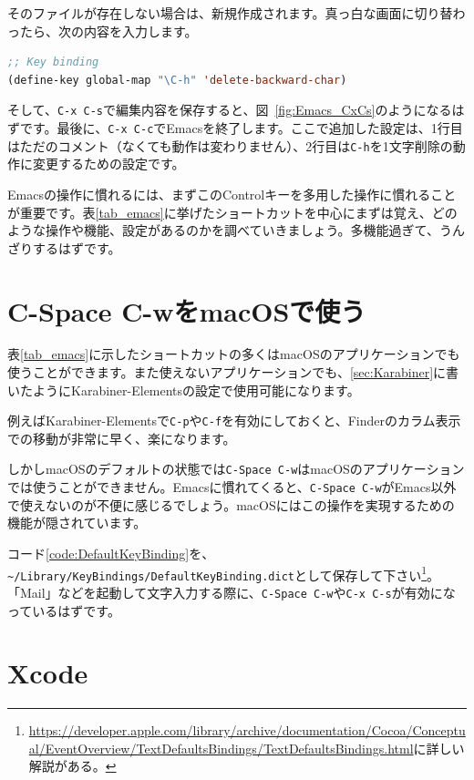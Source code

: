 そのファイルが存在しない場合は、新規作成されます。真っ白な画面に切り替わったら、次の内容を入力します。
\begin{lstlisting}[language=lisp]
;; Key binding
(define-key global-map "\C-h" 'delete-backward-char)
\end{lstlisting}
そして、\texttt{C-x C-s}で編集内容を保存すると、図~\ref{fig:Emacs_CxCs}のようになるはずです。最後に、\texttt{C-x C-c}でEmacsを終了します。ここで追加した設定は、1行目はただのコメント（なくても動作は変わりません）、2行目は\texttt{C-h}を1文字削除の動作に変更するための設定です。

Emacsの操作に慣れるには、まずこのControlキーを多用した操作に慣れることが重要です。表\ref{tab_emacs}に挙げたショートカットを中心にまずは覚え、どのような操作や機能、設定があるのかを調べていきましょう。多機能過ぎて、うんざりするはずです。

\section{C-Space C-wをmacOSで使う}

表\ref{tab_emacs}に示したショートカットの多くはmacOSのアプリケーションでも使うことができます。また使えないアプリケーションでも、\ref{sec:Karabiner}に書いたようにKarabiner-Elementsの設定で使用可能になります。

例えばKarabiner-Elementsで\texttt{C-p}や\texttt{C-f}を有効にしておくと、Finderのカラム表示での移動が非常に早く、楽になります。

しかしmacOSのデフォルトの状態では\texttt{C-Space C-w}はmacOSのアプリケーションでは使うことができません。Emacsに慣れてくると、\texttt{C-Space C-w}がEmacs以外で使えないのが不便に感じるでしょう。macOSにはこの操作を実現するための機能が隠されています。

コード\ref{code:DefaultKeyBinding}を、\texttt{\~{}/Library/KeyBindings/DefaultKeyBinding.dict}として保存して下さい\footnote{\url{https://developer.apple.com/library/archive/documentation/Cocoa/Conceptual/EventOverview/TextDefaultsBindings/TextDefaultsBindings.html}に詳しい解説がある。}。「Mail」などを起動して文字入力する際に、\texttt{C-Space C-w}や\texttt{C-x C-s}が有効になっているはずです。



\section{Xcode}

